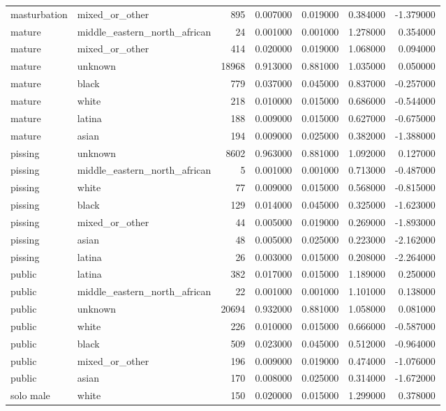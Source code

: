 \begin{tabular}{llrrrrr}
masturbation & mixed_or_other & 895 & 0.007000 & 0.019000 & 0.384000 & -1.379000 \\
mature & middle_eastern_north_african & 24 & 0.001000 & 0.001000 & 1.278000 & 0.354000 \\
mature & mixed_or_other & 414 & 0.020000 & 0.019000 & 1.068000 & 0.094000 \\
mature & unknown & 18968 & 0.913000 & 0.881000 & 1.035000 & 0.050000 \\
mature & black & 779 & 0.037000 & 0.045000 & 0.837000 & -0.257000 \\
mature & white & 218 & 0.010000 & 0.015000 & 0.686000 & -0.544000 \\
mature & latina & 188 & 0.009000 & 0.015000 & 0.627000 & -0.675000 \\
mature & asian & 194 & 0.009000 & 0.025000 & 0.382000 & -1.388000 \\
pissing & unknown & 8602 & 0.963000 & 0.881000 & 1.092000 & 0.127000 \\
pissing & middle_eastern_north_african & 5 & 0.001000 & 0.001000 & 0.713000 & -0.487000 \\
pissing & white & 77 & 0.009000 & 0.015000 & 0.568000 & -0.815000 \\
pissing & black & 129 & 0.014000 & 0.045000 & 0.325000 & -1.623000 \\
pissing & mixed_or_other & 44 & 0.005000 & 0.019000 & 0.269000 & -1.893000 \\
pissing & asian & 48 & 0.005000 & 0.025000 & 0.223000 & -2.162000 \\
pissing & latina & 26 & 0.003000 & 0.015000 & 0.208000 & -2.264000 \\
public & latina & 382 & 0.017000 & 0.015000 & 1.189000 & 0.250000 \\
public & middle_eastern_north_african & 22 & 0.001000 & 0.001000 & 1.101000 & 0.138000 \\
public & unknown & 20694 & 0.932000 & 0.881000 & 1.058000 & 0.081000 \\
public & white & 226 & 0.010000 & 0.015000 & 0.666000 & -0.587000 \\
public & black & 509 & 0.023000 & 0.045000 & 0.512000 & -0.964000 \\
public & mixed_or_other & 196 & 0.009000 & 0.019000 & 0.474000 & -1.076000 \\
public & asian & 170 & 0.008000 & 0.025000 & 0.314000 & -1.672000 \\
solo male & white & 150 & 0.020000 & 0.015000 & 1.299000 & 0.378000 \\

\end{tabular}
